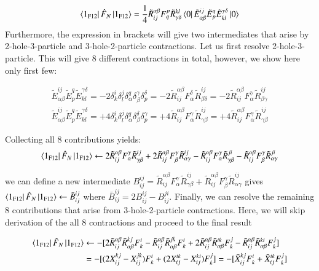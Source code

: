 \documentclass[journal=jacsat]{achemso}
\numberwithin{equation}{section}
\begin{document}
\begin{align}
\bra{1_{\text{F12}}}\hat{F}_{N}\ket{1_{\text{F12}}}=\frac{1}{4}\tilde{R}_{ij}^{\alpha\beta}F^{p}_{q}\tilde{R}^{kl}_{\gamma\delta}\bra{0}\tilde{E}^{ij}_{\alpha\beta}\tilde{E}^{q}_{p}\tilde{E}^{\gamma\delta}_{kl}\ket{0}
\end{align}
Furthermore, the expression in brackets will give two intermediates that arise by 2-hole-3-particle and 3-hole-2-particle contractions. Let us first resolve 2-hole-3-particle. This will give 8 different contractions in total, however, we show here only first few:

\begin{align}
\tilde{E}^{ij}_{\alpha\beta}\tilde{E}^{q}_{p}\tilde{E}^{\gamma\delta}_{kl}=-2\delta^{i}_{k}\delta^{j}_{l}\delta^{q}_{\alpha}\delta^{\gamma}_{\beta}\delta^{\delta}_{p}=-2\tilde{R}^{\alpha\beta}_{ij}F^{\delta}_{\alpha}\tilde{R}^{ij}_{\beta\delta}=-2\tilde{R}^{\alpha\beta}_{ij}F^{\gamma}_{\alpha}\tilde{R}^{ij}_{\beta\gamma}\\
\tilde{E}^{ij}_{\alpha\beta}\tilde{E}^{q}_{p}\tilde{E}^{\gamma\delta}_{kl}=+4\delta^{i}_{k}\delta^{j}_{l}\delta^{q}_{\alpha}\delta^{\delta}_{\beta}\delta^{\gamma}_{p}=+4\tilde{R}^{\alpha\beta}_{ij}F^{\gamma}_{\alpha}\tilde{R}^{ij}_{\gamma\beta}=+4\tilde{R}^{\alpha\beta}_{ij}F^{\gamma}_{\alpha}\tilde{R}^{ij}_{\gamma\beta}
\end{align}  

Collecting all 8 contributions yields:
\begin{align}
\bra{1_{\text{F12}}}\hat{F}_{N}\ket{1_{\text{F12}}}\leftarrow2\tilde{R}^{\alpha\beta}_{ij}F^{\gamma}_{\alpha}\tilde{R}^{ij}_{\gamma\beta}+2\tilde{R}^{\alpha\beta}_{ij}F^{\gamma}_{\beta}\tilde{R}^{ij}_{\alpha\gamma}-\tilde{R}^{\alpha\beta}_{ij}F^{\gamma}_{\alpha}\tilde{R}^{ji}_{\gamma\beta}-\tilde{R}^{\alpha\beta}_{ij}F^{\gamma}_{\beta}\tilde{R}^{ji}_{\alpha\gamma}
\end{align}

we can define a new intermediate $B^{ij}_{ij}=\tilde{R}^{\alpha\beta}_{ij}F^{\gamma}_{\alpha}\tilde{R}^{ij}_{\gamma\beta}+\tilde{R}^{\alpha\beta}_{ij}F^{\gamma}_{\beta}\tilde{R}^{ij}_{\alpha\gamma}$ gives $\bra{1_{\text{F12}}}\hat{F}_{N}\ket{1_{\text{F12}}}\leftarrow\bar{B}^{ij}_{ij}$ where $\bar{B}^{ij}_{ij}=2B^{ij}_{ij}-B^{ji}_{ij}$. Finally, we can resolve the remaining 8 contributions that arise from 3-hole-2-particle contractions. Here, we will skip derivation of the all 8 contractions and proceed to the final result  

\begin{align}
\bra{1_{\text{F12}}}\hat{F}_{N}\ket{1_{\text{F12}}}&\leftarrow-[2\tilde{R}^{\alpha\beta}_{ij}\tilde{R}^{kj}_{\alpha\beta}F^{i}_{k}-\tilde{R}^{\alpha\beta}_{ij}\tilde{R}^{jk}_{\alpha\beta}F^{i}_{k}+2\tilde{R}^{\alpha\beta}_{ij}\tilde{R}^{ik}_{\alpha\beta}F^{j}_{k}-\tilde{R}^{\alpha\beta}_{ij}\tilde{R}^{ki}_{\alpha\beta}F^{j}_{k}]\\\nonumber
&=-[(2X^{kj}_{ij}-X^{jk}_{ij})F^{i}_{k}+(2X^{ik}_{ij}-X^{ki}_{ij})F^{j}_{k}]=-[\tilde{X}^{kj}_{ij}F^{i}_{k}+\tilde{X}^{ik}_{ij}F^{j}_{k}]
\end{align}
\end{document}
